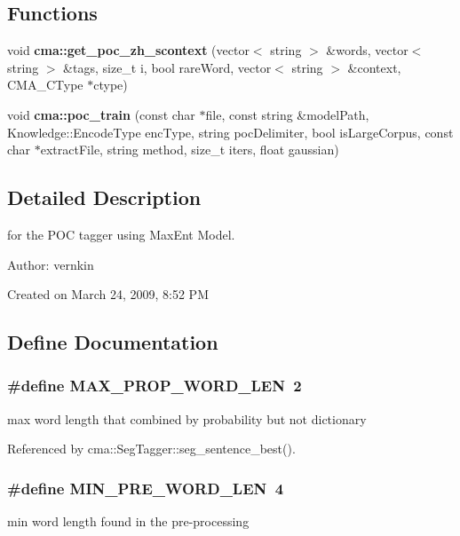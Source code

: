 \subsection*{Functions}
\begin{CompactItemize}
\item 
void {\bf cma::get\_\-poc\_\-zh\_\-scontext} (vector$<$ string $>$ \&words, vector$<$ string $>$ \&tags, size\_\-t i, bool rareWord, vector$<$ string $>$ \&context, CMA\_\-CType $\ast$ctype)
\item 
void {\bf cma::poc\_\-train} (const char $\ast$file, const string \&modelPath, Knowledge::EncodeType encType, string pocDelimiter, bool isLargeCorpus, const char $\ast$extractFile, string method, size\_\-t iters, float gaussian)
\end{CompactItemize}


\subsection{Detailed Description}
for the POC tagger using MaxEnt Model. 

\begin{Desc}
\item[Author:]vernkin\end{Desc}
Created on March 24, 2009, 8:52 PM 

\subsection{Define Documentation}
\subsubsection[{MAX\_\-PROP\_\-WORD\_\-LEN}]{\setlength{\rightskip}{0pt plus 5cm}\#define MAX\_\-PROP\_\-WORD\_\-LEN~2}\label{CMAPOCTagger_8h_8fc9320f6cd5f28fb162b4827bb441e5}


max word length that combined by probability but not dictionary 

Referenced by cma::SegTagger::seg\_\-sentence\_\-best().
\subsubsection[{MIN\_\-PRE\_\-WORD\_\-LEN}]{\setlength{\rightskip}{0pt plus 5cm}\#define MIN\_\-PRE\_\-WORD\_\-LEN~4}\label{CMAPOCTagger_8h_9447760a054b1929f095f9ba142b9b21}


min word length found in the pre-processing 